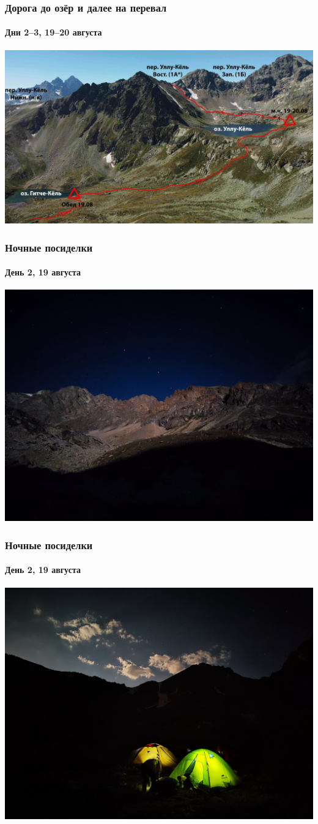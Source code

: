 \begin{frame}
	\frametitle{Дорога до озёр и далее на перевал}
	\framesubtitle{Дни 2--3, 19--20 августа}
	\centering
	\includegraphics[width=\linewidth]{../pics/ullu_kuel_route}
\end{frame} 

\begin{frame}
	\frametitle{Ночные посиделки}
	\framesubtitle{День 2, 19 августа}
	\centering
	\includegraphics[width=0.85\linewidth]{../pics/IMG_20240819_205705}
	\end{frame}

\begin{frame}
	\frametitle{Ночные посиделки}
	\framesubtitle{День 2, 19 августа}
	\centering
	\includegraphics[width=0.85\linewidth]{../pics/IMG_20240819_204810}
	\end{frame}

